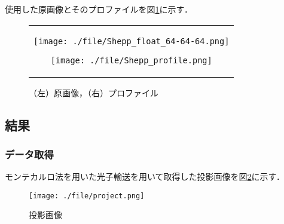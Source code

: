 \documentclass[dvipdfmx,autodetect-engine,twocolumn,10pt]{jsarticle}%
\begin{document}
使用した原画像とそのプロファイルを図\ref{original_img}に示す．
\begin{figure}[htbp]
  \begin{center}
    \begin{tabular}{c}

      \begin{minipage}{0.5\hsize}
        \begin{center}
          \texttt{[image: ./file/Shepp\_float\_64-64-64.png]}
        \end{center}
      \end{minipage}

      \begin{minipage}{0.5\hsize}
        \begin{center}
          \texttt{[image: ./file/Shepp\_profile.png]}
        \end{center}
      \end{minipage}

    \end{tabular}
  \caption{（左）原画像，（右）プロファイル}
  \label{original_img}
  \end{center}
\end{figure}


\subsection{結果}
\subsubsection{データ取得}
モンテカルロ法を用いた光子輸送を用いて取得した投影画像を図\ref{proj}に示す．
\begin{figure}[htbp]
  \begin{center}
    \texttt{[image: ./file/project.png]}\\
    \caption{投影画像}
    \label{proj}
  \end{center}
\end{figure}
\end{document}
